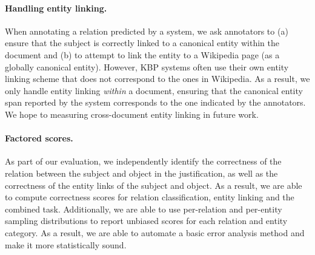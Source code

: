 \paragraph{Handling entity linking.}
When annotating a relation predicted by a system, we ask annotators to (a) ensure that the subject is correctly linked to a canonical entity within the document and (b) to attempt to link the entity to a Wikipedia page (as a globally canonical entity).
However, KBP systems often use their own entity linking scheme that does not correspond to the ones in Wikipedia.
As a result, we only handle entity linking \textit{within} a document, ensuring that the canonical entity span reported by the system corresponds to the one indicated by the annotators.
We hope to measuring cross-document entity linking in future work.

\paragraph{Factored scores.}
As part of our evaluation, we independently identify the correctness of the relation between the subject and object in the justification, as well as the correctness of the entity links of the subject and object.
As a result, we are able to compute correctness scores for relation classification, entity linking and the combined task.
Additionally, we are able to use per-relation and per-entity sampling distributions to report unbiased scores for each relation and entity category.
As a result, we are able to automate a basic error analysis method and make it more statistically sound.

